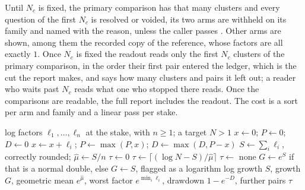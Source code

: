 \documentclass[11pt]{article}
\theoremstyle{plain}
\theoremstyle{definition}
\theoremstyle{remark}
\begin{document}
Until $N_c$ is fixed, the primary comparison has that many clusters and every question of the first
$N_c$ is resolved or voided, its two arms are withheld on its family and named with the reason,
unless the caller passes . Other arms are shown, among them the recorded copy of
the reference, whose factors are all exactly $1$. Once $N_c$ is fixed the readout reads only the
first $N_c$ clusters of the primary comparison, in the order their first pair entered the ledger,
which is the cut the report makes, and says how many clusters and pairs it left out; a reader who
waits past $N_c$ reads what one who stopped there reads. Once the comparisons are readable, the full
report includes the readout. The cost is a sort per arm and family and a linear pass per stake.

\begin{algorithm}[t]
\caption{The growth path of one arm at one stake, in log space.}
\label{alg:path}
\small
\begin{algorithmic}[1]
\Require log factors $\ell_1,\dots,\ell_n$ at the stake, with $n\ge1$; a target $N>1$
\State $x\gets0$; $P\gets0$; $D\gets0$
  \State $x\gets x+\ell_i$; \quad $P\gets\max(P,x)$; \quad $D\gets\max(D,P-x)$
\EndFor
\State $S\gets\sum_i\ell_i$, correctly rounded; \quad $\hat\mu\gets S/n$
 $\tau\gets0$  $\tau\gets\lceil(\log N-S)/\hat\mu\rceil$
  \Else{} $\tau\gets$ none \EndIf
\State $G\gets e^S$ if that is a normal double, else $G\gets S$, flagged as a logarithm
\State \Return log growth $S$, growth $G$, geometric mean $e^{\hat\mu}$, worst factor
  $e^{\min_i\ell_i}$, drawdown $1-e^{-D}$, further pairs $\tau$
\end{algorithmic}
\end{algorithm}
\end{document}
